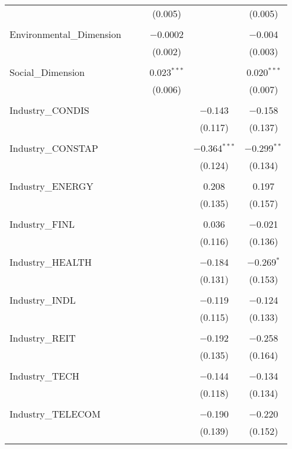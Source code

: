 \begin{table}[!htbp]
\begin{tabular}{@{\extracolsep{5pt}}lccccc}
  &  &  & (0.005) &  & (0.005) \\ 
  & & & & & \\ 
 Environmental\_Dimension &  &  & $-$0.0002 &  & $-$0.004 \\ 
  &  &  & (0.002) &  & (0.003) \\ 
  & & & & & \\ 
 Social\_Dimension &  &  & 0.023$^{***}$ &  & 0.020$^{***}$ \\ 
  &  &  & (0.006) &  & (0.007) \\ 
  & & & & & \\ 
 Industry\_CONDIS &  &  &  & $-$0.143 & $-$0.158 \\ 
  &  &  &  & (0.117) & (0.137) \\ 
  & & & & & \\ 
 Industry\_CONSTAP &  &  &  & $-$0.364$^{***}$ & $-$0.299$^{**}$ \\ 
  &  &  &  & (0.124) & (0.134) \\ 
  & & & & & \\ 
 Industry\_ENERGY &  &  &  & 0.208 & 0.197 \\ 
  &  &  &  & (0.135) & (0.157) \\ 
  & & & & & \\ 
 Industry\_FINL &  &  &  & 0.036 & $-$0.021 \\ 
  &  &  &  & (0.116) & (0.136) \\ 
  & & & & & \\ 
 Industry\_HEALTH &  &  &  & $-$0.184 & $-$0.269$^{*}$ \\ 
  &  &  &  & (0.131) & (0.153) \\ 
  & & & & & \\ 
 Industry\_INDL &  &  &  & $-$0.119 & $-$0.124 \\ 
  &  &  &  & (0.115) & (0.133) \\ 
  & & & & & \\ 
 Industry\_REIT &  &  &  & $-$0.192 & $-$0.258 \\ 
  &  &  &  & (0.135) & (0.164) \\ 
  & & & & & \\ 
 Industry\_TECH &  &  &  & $-$0.144 & $-$0.134 \\ 
  &  &  &  & (0.118) & (0.134) \\ 
  & & & & & \\ 
 Industry\_TELECOM &  &  &  & $-$0.190 & $-$0.220 \\ 
  &  &  &  & (0.139) & (0.152) \\ 
  & & & & & \\ 

\end{tabular}
\end{table}
